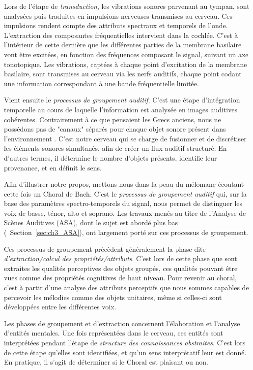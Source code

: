 Lors de l'étape de \emph{transduction}, les vibrations sonores parvenant au tympan, sont analysées puis traduites en impulsions nerveuses transmises au cerveau. Ces impulsions rendent compte des attributs spectraux et temporels de l'onde. L'extraction des composantes fréquentielles intervient dans la cochlée. C'est à l'intérieur de cette dernière que les différentes parties de la membrane basilaire vont être excitées, en fonction des fréquences composant le signal, suivant un axe tonotopique. Les vibrations, captées à chaque point d’excitation de la membrane basilaire, sont transmises au cerveau via les nerfs auditifs, chaque point codant une information correspondant à une bande fréquentielle limitée. 

Vient ensuite le \emph{processus de groupement auditif}. C'est une étape d'intégration temporelle au cours de laquelle l'information est analysée en images auditives cohérentes. Contrairement à ce que pensaient les Grecs anciens, nous ne possédons pas de "canaux" séparés pour chaque objet sonore présent dans l'environnement \citep{yost1994fundamentals}. C'est notre cerveau qui se charge de fusionner et de discrétiser les éléments sonores simultanés, afin de créer un flux auditif structuré. En d'autres termes, il détermine le nombre d'objets présents, identifie leur provenance, et en définit le sens. 

Afin d'illustrer notre propos, mettons nous dans la peau du mélomane écoutant cette fois un Choral de Bach. C'est le \emph{processus de groupement auditif} qui, sur la base des paramètres spectro-temporels du signal, nous permet de distinguer les voix de basse, ténor, alto et soprano. Les travaux menés au titre de l'Analyse de Scènes Auditives (ASA), dont le sujet est abordé plus bas (\cf~Section~\ref{sec:ch3_ASA}), ont largement porté sur ces processus de groupement.

Ces processus de groupement précèdent généralement la phase dite \emph{d'extraction/calcul des propriétés/attributs}. C'est lors de cette phase que sont extraites les qualités perceptives des objets groupés, ces qualités pouvant être vues comme des propriétés cognitives de haut niveau. Pour revenir au choral, c'est à partir d'une analyse des attributs perceptifs que nous sommes capables de percevoir les mélodies comme des objets unitaires, même si celles-ci sont développées entre les différentes voix.

Les phases de groupement et d'extraction concernent l'élaboration et l'analyse d'entités mentales. Une fois représentées dans le cerveau, ces entités sont interprétées pendant l'étape de \emph{structure des connaissances abstraites}. C'est lors de cette étape qu'elles sont identifiées, et qu'un sens interprétatif leur est donné. En pratique, il s'agit de déterminer si le Choral est plaisant ou non.

